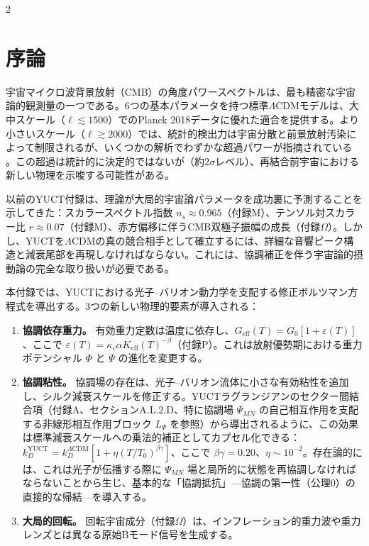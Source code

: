 \documentclass[11pt,a4paper]{article}
\begin{document}
	\vspace{0.4cm}
	
	\begin{multicols}{2}
		
		\section{序論}
		
		宇宙マイクロ波背景放射（CMB）の角度パワースペクトルは、最も精密な宇宙論的観測量の一つである。6つの基本パラメータを持つ標準\(\Lambda\)CDMモデルは、大中スケール（\(\ell \lesssim 1500\)）でのPlanck 2018データに優れた適合を提供する。より小さいスケール（\(\ell \gtrsim 2000\)）では、統計的検出力は宇宙分散と前景放射汚染によって制限されるが、いくつかの解析でわずかな超過パワーが指摘されている \cite{Planck2018}。この超過は統計的に決定的ではないが（約\(2\sigma\)レベル）、再結合前宇宙における新しい物理を示唆する可能性がある。
		
		以前のYUCT付録は、理論が大局的宇宙論パラメータを成功裏に予測することを示してきた：スカラースペクトル指数 \(n_s \approx 0.965\)（付録M）、テンソル対スカラー比 \(r \approx 0.07\)（付録M）、赤方偏移に伴うCMB双極子振幅の成長（付録\(\Omega\)）。しかし、YUCTを\(\Lambda\)CDMの真の競合相手として確立するには、詳細な音響ピーク構造と減衰尾部を再現しなければならない。これには、協調補正を伴う宇宙論的摂動論の完全な取り扱いが必要である。
		
		本付録では、YUCTにおける光子–バリオン動力学を支配する修正ボルツマン方程式を導出する。3つの新しい物理的要素が導入される：
		\begin{enumerate}
			\item \textbf{協調依存重力。} 有効重力定数は温度に依存し、\(G_{\mathrm{eff}}(T) = G_0[1 + \varepsilon(T)]\)、ここで \(\varepsilon(T) = \kappa_c \alpha K_{\mathrm{eff}}(T)^{-\beta}\)（付録P）。これは放射優勢期における重力ポテンシャル \(\Phi\) と \(\Psi\) の進化を変更する。
			\item \textbf{協調粘性。} 協調場の存在は、光子–バリオン流体に小さな有効粘性を追加し、シルク減衰スケールを修正する。YUCTラグランジアンのセクター間結合項（付録A、セクションA.L.2.D、特に協調場 \(\Psi_{MN}\) の自己相互作用を支配する非線形相互作用ブロック \(L_{\Psi}\) を参照）から導出されるように、この効果は標準減衰スケールへの乗法的補正としてカプセル化できる：\(k_D^{\text{YUCT}} = k_D^{\Lambda\text{CDM}} [1 + \eta (T/T_0)^{\beta\gamma}]\)、ここで \(\beta\gamma = 0.20\)、\(\eta \sim 10^{-2}\)。存在論的には、これは光子が伝播する際に \(\Psi_{MN}\) 場と局所的に状態を再協調しなければならないことから生じ、基本的な「協調抵抗」—協調の第一性（公理0）の直接的な帰結—を導入する。
			\item \textbf{大局的回転。} 回転宇宙成分（付録\(\Omega\)）は、インフレーション的重力波や重力レンズとは異なる原始Bモード信号を生成する。
		\end{enumerate}
		

\end{multicols}
\end{document}
